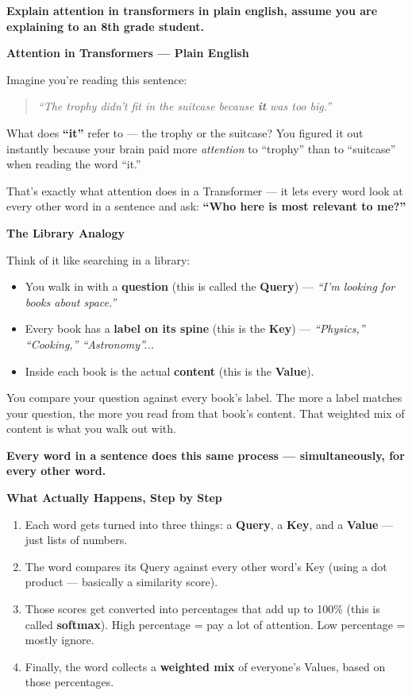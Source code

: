 \textbf{Explain attention in transformers in plain english, assume you are explaining to an 8th grade student.}

\medskip

\textbf{Attention in Transformers --- Plain English}

Imagine you're reading this sentence:

\begin{quote}
\textit{``The trophy didn't fit in the suitcase because \textbf{it} was too big.''}
\end{quote}

What does \textbf{``it''} refer to --- the trophy or the suitcase? You figured it out instantly because your brain paid more \textit{attention} to ``trophy'' than to ``suitcase'' when reading the word ``it.''

That's exactly what attention does in a Transformer --- it lets every word look at every other word in a sentence and ask: \textbf{``Who here is most relevant to me?''}

\medskip
\textbf{The Library Analogy}

Think of it like searching in a library:

\begin{itemize}
\item You walk in with a \textbf{question} (this is called the \textbf{Query}) --- \textit{``I'm looking for books about space.''}
\item Every book has a \textbf{label on its spine} (this is the \textbf{Key}) --- \textit{``Physics,'' ``Cooking,'' ``Astronomy''...}
\item Inside each book is the actual \textbf{content} (this is the \textbf{Value}).
\end{itemize}

You compare your question against every book's label. The more a label matches your question, the more you read from that book's content. That weighted mix of content is what you walk out with.

\textbf{Every word in a sentence does this same process --- simultaneously, for every other word.}

\medskip
\textbf{What Actually Happens, Step by Step}

\begin{enumerate}
\item Each word gets turned into three things: a \textbf{Query}, a \textbf{Key}, and a \textbf{Value} --- just lists of numbers.
\item The word compares its Query against every other word's Key (using a dot product --- basically a similarity score).
\item Those scores get converted into percentages that add up to 100\% (this is called \textbf{softmax}). High percentage = pay a lot of attention. Low percentage = mostly ignore.
\item Finally, the word collects a \textbf{weighted mix} of everyone's Values, based on those percentages.
\end{enumerate}

